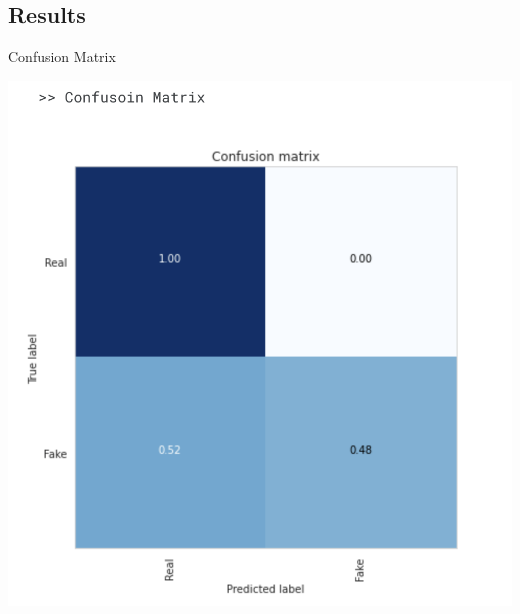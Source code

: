 \documentclass[hyperref={pdfpagelabels=false}, color=table]{beamer}
\begin{document}
\subsection{Results}
    \begin{frame}{Confusion Matrix}
        \begin{center}
            \includegraphics[scale=.4]{images/cm}
        \end{center}
    \end{frame}

    
\end{document}
